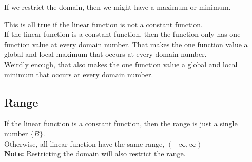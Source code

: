 \documentclass{ximera}
\begin{document}
If we restrict the domain, then we might have a maximum or minimum. \\



\begin{warning}

This is all true if the linear function is not a constant function. \\


If the linear function is a constant function, then the function only has one function value at every domain number.  That makes the one function value a global and local maximum that occurs at every domain number. \\

Weirdly enough, that also makes the one function value a global and local minimum that occurs at every domain number.

\end{warning}



\subsection*{Range}


If the linear function is a constant function, then the range is just a single number $\{ B \}$. \\

Otherwise, all linear function have the same range, $(-\infty, \infty)$ \\

\textbf{Note:} Restricting the domain will also restrict the range.\\
\end{document}
